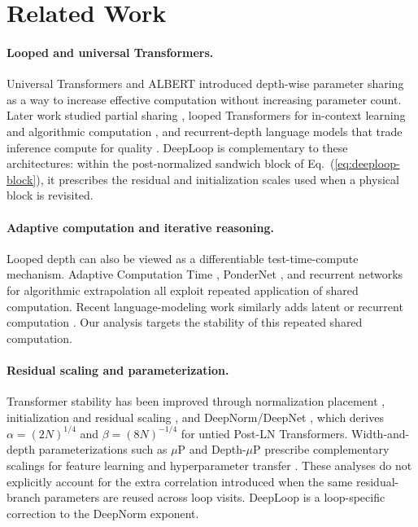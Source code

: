 \documentclass[11pt]{airesearch}
\begin{document}
\section{Related Work}
\label{sec:related}

\paragraph{Looped and universal Transformers.}
Universal Transformers \citep{dehghani2018universal} and ALBERT
\citep{lan2019albert} introduced depth-wise parameter sharing as a way to
increase effective computation without increasing parameter count. Later work
studied partial sharing \citep{reid2021subformer}, looped Transformers for
in-context learning and algorithmic computation \citep{giannou2023looped,
yang2023looped,gatmiry2024can}, and recurrent-depth language models that trade
inference compute for quality \citep{geiping2025scaling}. DeepLoop is
complementary to these architectures: within the post-normalized sandwich
block of Eq.~(\ref{eq:deeploop-block}), it prescribes the residual and
initialization scales used when a physical block is revisited.

\paragraph{Adaptive computation and iterative reasoning.}
Looped depth can also be viewed as a differentiable test-time-compute
mechanism. Adaptive Computation Time \citep{graves2016adaptive}, PonderNet
\citep{banino2021pondernet}, and recurrent networks for algorithmic
extrapolation \citep{schwarzschild2021can,bansal2022end} all exploit repeated
application of shared computation. Recent language-modeling work similarly adds
latent or recurrent computation \citep{goyal2023think,hao2024training,
saunshi2025reasoning}. Our analysis targets the stability of this repeated
shared computation.

\paragraph{Residual scaling and parameterization.}
Transformer stability has been improved through normalization placement
\citep{xiong2020layer,nguyen2019transformers}, initialization and residual
scaling \citep{zhang2019fixup,huang2020improving,de2020batch,
bachlechner2021rezero,liu2020understanding}, and DeepNorm/DeepNet
\citep{wang2024deepnet}, which derives $\alpha=(2N)^{1/4}$ and
$\beta=(8N)^{-1/4}$ for untied Post-LN Transformers. Width-and-depth
parameterizations such as $\mu$P and Depth-$\mu$P prescribe complementary
scalings for feature learning and hyperparameter transfer
\citep{yang2021tensor,yang2021tuning,yang2023tensor,bordelon2023depthwise}.
These analyses do not explicitly account for the extra correlation introduced when the same residual-branch parameters are reused across loop visits.
DeepLoop is a loop-specific correction to the DeepNorm exponent.
\end{document}
